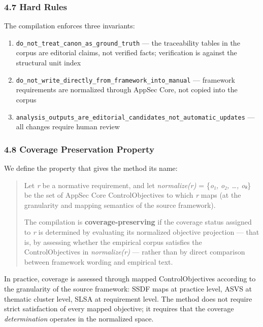 \documentclass[
]{article}
\providecommand{\tightlist}{%
  \setlength{\itemsep}{0pt}\setlength{\parskip}{0pt}}
\begin{document}
\subsubsection{4.7 Hard Rules}\label{hard-rules}

The compilation enforces three invariants:

\begin{enumerate}
\def\labelenumi{\arabic{enumi}.}
\tightlist
\item
  \texttt{do\_not\_treat\_canon\_as\_ground\_truth} --- the traceability
  tables in the corpus are editorial claims, not verified facts;
  verification is against the structural unit index
\item
  \texttt{do\_not\_write\_directly\_from\_framework\_into\_manual} ---
  framework requirements are normalized through AppSec Core, not copied
  into the corpus
\item
  \texttt{analysis\_outputs\_are\_editorial\_candidates\_not\_automatic\_updates}
  --- all changes require human review
\end{enumerate}

\subsubsection{4.8 Coverage Preservation
Property}\label{coverage-preservation-property}

We define the property that gives the method its name:

\begin{quote}
Let \emph{r} be a normative requirement, and let \emph{normalize(r)} =
\{\emph{o₁, o₂, \ldots, oₖ}\} be the set of AppSec Core
ControlObjectives to which \emph{r} maps (at the granularity and mapping
semantics of the source framework).

The compilation is \textbf{coverage-preserving} if the coverage status
assigned to \emph{r} is determined by evaluating its normalized
objective projection --- that is, by assessing whether the empirical
corpus satisfies the ControlObjectives in \emph{normalize(r)} --- rather
than by direct comparison between framework wording and empirical text.
\end{quote}

In practice, coverage is assessed through mapped ControlObjectives
according to the granularity of the source framework: SSDF maps at
practice level, ASVS at thematic cluster level, SLSA at requirement
level. The method does not require strict satisfaction of every mapped
objective; it requires that the coverage \emph{determination} operates
in the normalized space.
\end{document}
